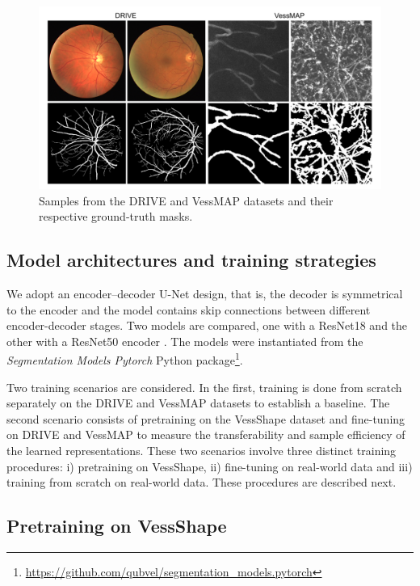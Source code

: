 \documentclass[%
reprint,
nofootinbib,
 amsmath,amssymb,
aps,
superscriptaddress,
showkeys,
longbibliography
]{revtex4-1}
\begin{document}
\begin{figure}[tbp]
    \centering
    \includegraphics[width=\columnwidth]{figures/results/drive_vessmap_samples.pdf}
    \caption{Samples from the DRIVE and VessMAP datasets and their respective ground-truth masks.}
    \label{f:drive_vessmap_samples}
\end{figure}

\subsection{Model architectures and training strategies}

We adopt an encoder–decoder U-Net design, that is, the decoder is symmetrical to the encoder and the model contains skip connections between different encoder-decoder stages. Two models are compared, one with a ResNet18 and the other with a ResNet50 encoder \cite{he2016deep}. The models were instantiated from the \textit{Segmentation Models Pytorch} Python package\footnote{\url{https://github.com/qubvel/segmentation_models.pytorch}}.

Two training scenarios are considered. In the first, training is done from scratch separately on the DRIVE and VessMAP datasets to establish a baseline. The second scenario consists of pretraining on the VessShape dataset and fine-tuning on DRIVE and VessMAP to measure the transferability and sample efficiency of the learned representations. These two scenarios involve three distinct training procedures: i) pretraining on VessShape, ii) fine-tuning on real-world data and iii) training from scratch on real-world data. These procedures are described next.

\subsection{Pretraining on VessShape}
\end{document}

